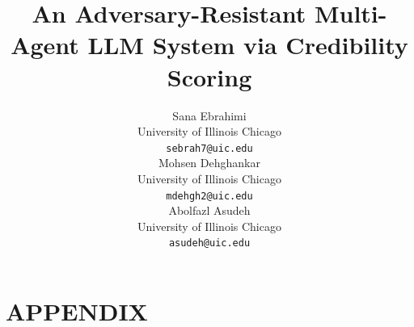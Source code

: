 \documentclass[11pt]{article}
\title{An Adversary-Resistant Multi-Agent LLM System via Credibility Scoring}
\author{Sana Ebrahimi \\
    University of Illinois Chicago \\
  \texttt{sebrah7@uic.edu} \\\And
  Mohsen Dehghankar \\
  University of Illinois Chicago\\
  \texttt{mdehgh2@uic.edu} \\\And
  Abolfazl Asudeh \\
  University of Illinois Chicago\\
  \texttt{asudeh@uic.edu}\\}
\begin{document}
\maketitle













\appendix
\section*{APPENDIX}





\end{document}
